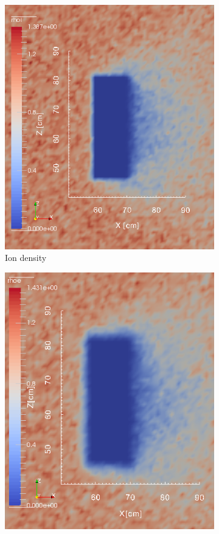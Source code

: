 \documentclass[twoside]{article}
\begin{document}
\begin{figure}[H]
\centering
\begin{subfigure}{.5\textwidth}
  \centering
  \includegraphics[width=\linewidth]{zoom/rhoi_Y(zoom).png}
  \caption{Ion density}
  \label{fig:sub41}
\end{subfigure}%
\begin{subfigure}{.5\textwidth}
  \centering
  \includegraphics[width=0.955\linewidth]{zoom/rhoe_Y(zoom).png}

\end{subfigure}
\end{figure}
\end{document}
